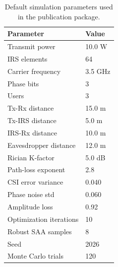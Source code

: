 \begin{table}[t]
\caption{Default simulation parameters used in the publication package.}
\label{tab:setup}
\centering
\begin{tabular}{ll}
\hline
Parameter & Value \\
\hline
Transmit power & 10.0 W \\
IRS elements & 64 \\
Carrier frequency & 3.5 GHz \\
Phase bits & 3 \\
Users & 3 \\
Tx-Rx distance & 15.0 m \\
Tx-IRS distance & 5.0 m \\
IRS-Rx distance & 10.0 m \\
Eavesdropper distance & 12.0 m \\
Rician K-factor & 5.0 dB \\
Path-loss exponent & 2.8 \\
CSI error variance & 0.040 \\
Phase noise std & 0.060 \\
Amplitude loss & 0.92 \\
Optimization iterations & 10 \\
Robust SAA samples & 8 \\
Seed & 2026 \\
Monte Carlo trials & 120 \\
\hline
\end{tabular}
\end{table}
